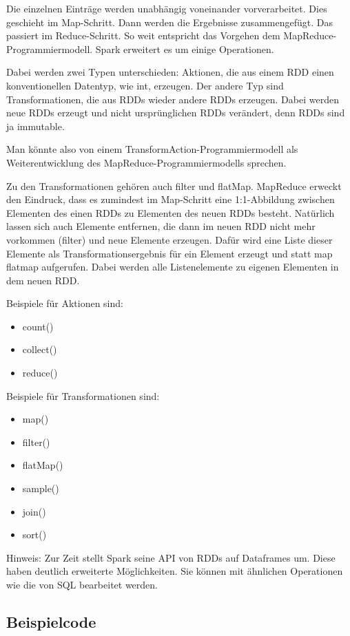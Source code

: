 Die einzelnen Einträge werden unabhängig voneinander vorverarbeitet.
Dies geschieht im Map-Schritt. Dann werden die Ergebnisse
zusammengefügt. Das passiert im Reduce-Schritt. So weit entspricht das
Vorgehen dem MapReduce-Programmiermodell. Spark erweitert es um einige
Operationen.

Dabei werden zwei Typen unterschieden: Aktionen, die aus einem RDD einen
konventionellen Datentyp, wie int, erzeugen. Der andere Typ sind
Transformationen, die aus RDDs wieder andere RDDs erzeugen. Dabei
werden neue RDDs erzeugt und nicht ursprünglichen RDDs verändert, denn
RDDs sind ja immutable.

Man könnte also von einem TransformAction-Programmiermodell als
Weiterentwicklung des MapReduce-Programmiermodells sprechen.

Zu den Transformationen gehören auch filter und flatMap. MapReduce
erweckt den Eindruck, dass es zumindest im Map-Schritt eine
1:1-Abbildung zwischen Elementen des einen RDDs zu Elementen des neuen
RDDs besteht. Natürlich lassen sich auch Elemente entfernen, die dann
im neuen RDD nicht mehr vorkommen (filter) und neue Elemente erzeugen. Dafür
wird eine Liste dieser Elemente als Transformationsergebnis für ein
Element erzeugt und statt map flatmap aufgerufen. Dabei werden alle
Listenelemente zu eigenen Elementen in dem neuen RDD.

Beispiele für Aktionen sind:

\begin{itemize}
\item count()
\item collect()
\item reduce()
\end{itemize}
Beispiele für Transformationen sind:

\begin{itemize}
\item map()
\item filter()
\item flatMap()
\item sample()
\item join()
\item sort()
\end{itemize}
Hinweis: Zur Zeit stellt Spark seine API von RDDs auf Dataframes um.
Diese haben deutlich erweiterte Möglichkeiten. Sie können mit ähnlichen
Operationen wie die von SQL bearbeitet werden.


\subsection{Beispielcode}

